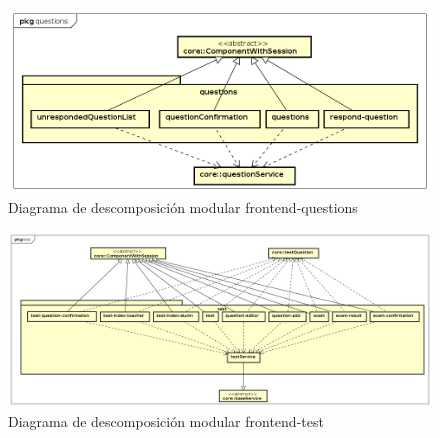 \documentclass[openright,twoside,10pt]{book}
\begin{document}
    \vspace*{\fill} \newpage
    
    \vspace*{\fill}
    
    \begin{figure}[H]
        \begin{center}
            \includegraphics[width=\textwidth]{img/astah/disenio/descomposicion/front/questions.png}
        \end{center}
        \caption{Diagrama de descomposición modular frontend-questions}
    \end{figure}
    
    \vspace*{\fill} \newpage
    
    \vspace*{\fill}
    
    \begin{figure}[H]
        \begin{center}
            \includegraphics[width=\textwidth]{img/astah/disenio/descomposicion/front/test.png}
        \end{center}
        \caption{Diagrama de descomposición modular frontend-test}
    \end{figure}
    
    \vspace*{\fill} \newpage
    
    \vspace*{\fill}
    
\end{document}
